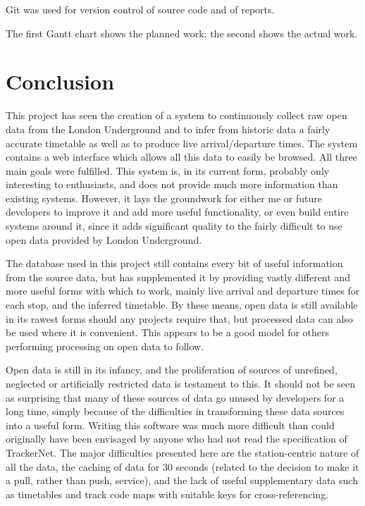 \documentclass[a4paper,12pt,twoside]{report}
\begin{document}
Git was used for version control of source code and of reports.

The first Gantt chart shows the planned work; the second shows the actual work.




\chapter{Conclusion}

This project has seen the creation of a system to continuously collect raw open
data from the London Underground and to infer from historic data a fairly
accurate timetable as well as to produce live arrival/departure times. The
system contains a web interface which allows all this data to easily be
browsed. All three main goals were fulfilled. This system is, in its current
form, probably only interesting to enthusiasts, and does not provide much more
information than existing systems. However, it lays the groundwork for either
me or future developers to improve it and add more useful functionality, or
even build entire systems around it, since it adds significant quality to the
fairly difficult to use open data provided by London Underground.

The database used in this project still contains every bit of useful
information from the source data, but has supplemented it by providing vastly
different and more useful forms with which to work, mainly live arrival and
departure times for each stop, and the inferred timetable. By these means, open
data is still available in its rawest forms should any projects require that,
but processed data can also be used where it is convenient. This appears to be
a good model for others performing processing on open data to follow.

Open data is still in its infancy, and the proliferation of sources of
unrefined, neglected or artificially restricted data is testament to this. It
should not be seen as surprising that many of these sources of data go unused
by developers for a long time, simply because of the difficulties in
transforming these data sources into a useful form. Writing this software was
much more difficult than could originally have been envisaged by anyone who had
not read the specification of TrackerNet. The major difficulties presented here
are the station-centric nature of all the data, the caching of data for 30
seconds (related to the decision to make it a pull, rather than push, service),
and the lack of useful supplementary data such as timetables and track code
maps with suitable keys for cross-referencing.
\end{document}
